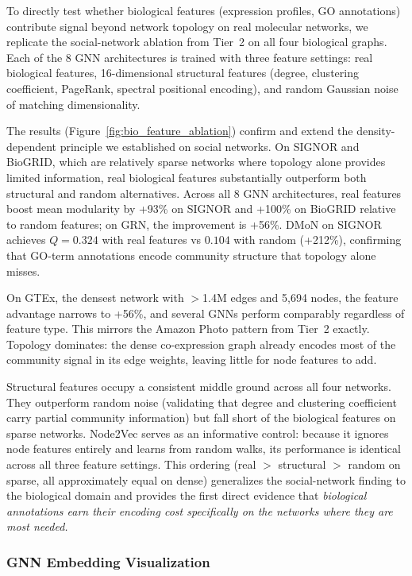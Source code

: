 \documentclass[11pt]{article}
\begin{document}
To directly test whether biological features (expression profiles, GO annotations) contribute signal beyond network topology on real molecular networks, we replicate the social-network ablation from Tier~2 on all four biological graphs.
Each of the 8 GNN architectures is trained with three feature settings: real biological features, 16-dimensional structural features (degree, clustering coefficient, PageRank, spectral positional encoding), and random Gaussian noise of matching dimensionality.

The results (Figure~\ref{fig:bio_feature_ablation}) confirm and extend the density-dependent principle we established on social networks.
On SIGNOR and BioGRID, which are relatively sparse networks where topology alone provides limited information, real biological features substantially outperform both structural and random alternatives.
Across all 8 GNN architectures, real features boost mean modularity by +93\% on SIGNOR and +100\% on BioGRID relative to random features; on GRN, the improvement is +56\%.
DMoN on SIGNOR achieves $Q = 0.324$ with real features vs $0.104$ with random (+212\%), confirming that GO-term annotations encode community structure that topology alone misses.

On GTEx, the densest network with $>$1.4M edges and 5{,}694 nodes, the feature advantage narrows to +56\%, and several GNNs perform comparably regardless of feature type.
This mirrors the Amazon Photo pattern from Tier~2 exactly.
Topology dominates: the dense co-expression graph already encodes most of the community signal in its edge weights, leaving little for node features to add.

Structural features occupy a consistent middle ground across all four networks.
They outperform random noise (validating that degree and clustering coefficient carry partial community information) but fall short of the biological features on sparse networks.
Node2Vec serves as an informative control: because it ignores node features entirely and learns from random walks, its performance is identical across all three feature settings.
This ordering (real $>$ structural $>$ random on sparse, all approximately equal on dense) generalizes the social-network finding to the biological domain and provides the first direct evidence that \emph{biological annotations earn their encoding cost specifically on the networks where they are most needed.}

\subsubsection{GNN Embedding Visualization}
\end{document}
